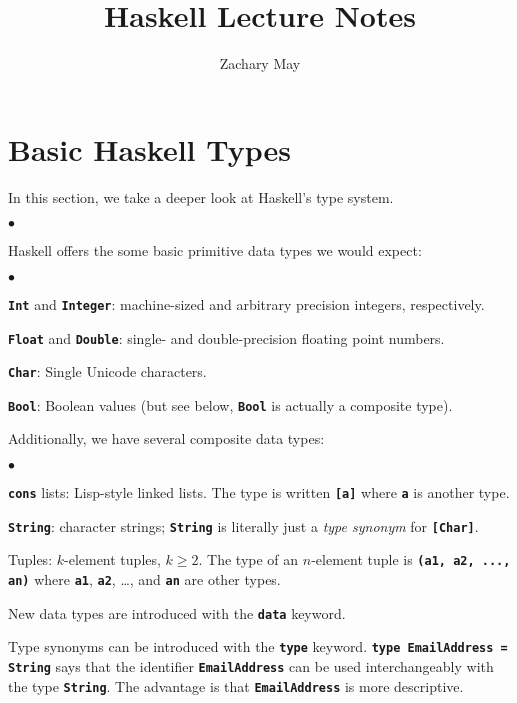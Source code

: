 \documentclass[12pt]{article}
\author{Zachary May}
\title{Haskell Lecture Notes}
\newcommand\code[1]{\texttt{\textbf{#1}}}
\newenvironment{notelist}{\begin{list}
   {$\bullet$}
   {\setlength{\itemsep}{0in}}}
   {\end{list}}
\begin{document}
\maketitle

\section{Basic Haskell Types}

In this section, we take a deeper look at Haskell's type system.

\begin{notelist}
\item Haskell offers the some basic primitive data types we would expect: \cite{haskell98}
\begin{notelist}
    \item \code{Int} and \code{Integer}: machine-sized and arbitrary precision integers, respectively.
    \item \code{Float} and \code{Double}: single- and double-precision floating point numbers.
    \item \code{Char}: Single Unicode characters.
    \item \code{Bool}: Boolean values (but see below, \code{Bool} is actually a composite type).
\end{notelist}

\item Additionally, we have several composite data types:
\begin{notelist}
    \item \code{cons} lists: Lisp-style linked lists. The type is written \code{[a]} where \code{a}
          is another type.
    \item \code{String}: character strings; \code{String} is literally just a \textit{type synonym} for \code{[Char]}.
    \item Tuples: $k$-element tuples, $k \geq 2$. The type of an $n$-element tuple is \code{(a1, a2, ..., an)} where
          \code{a1}, \code{a2}, \ldots, and \code{an} are other types.
\end{notelist}

\item New data types are introduced with the \code{data} keyword.

\item Type synonyms can be introduced with the \code{type} keyword. \code{type EmailAddress = String} says that 
      the identifier \code{EmailAddress} can be used interchangeably with the type \code{String}. The advantage
      is that \code{EmailAddress} is more descriptive.


\end{notelist}
\end{document}
